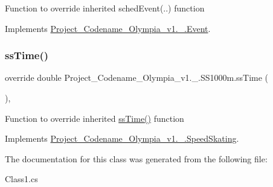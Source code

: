 Function to override inherited sched\+Event(..) function 

Implements \hyperlink{classProject__Codename__Olympia__v1_1_1__0_1_1Event_abb4e2b9c28527b9a28395f2fe9192196}{Project\+\_\+\+Codename\+\_\+\+Olympia\+\_\+v1.\+\_.\+Event}.

\mbox{\label{classProject__Codename__Olympia__v1_1_1__0_1_1SS1000m_a4bfd83bce70e047370288c0b651e3e1c}} 
\subsubsection{\texorpdfstring{ss\+Time()}{ssTime()}}
{\footnotesize\ttfamily override double Project\+\_\+\+Codename\+\_\+\+Olympia\+\_\+v1.\+\_.\+S\+S1000m.\+ss\+Time (\begin{DoxyParamCaption}{ }\end{DoxyParamCaption})\hspace{0.3cm}{\ttfamily [inline]}, {\ttfamily [virtual]}}

Function to override inherited \hyperlink{classProject__Codename__Olympia__v1_1_1__0_1_1SS1000m_a4bfd83bce70e047370288c0b651e3e1c}{ss\+Time()} function 

Implements \hyperlink{classProject__Codename__Olympia__v1_1_1__0_1_1SpeedSkating_acedc7b2f1bfab95ee054531364ea50fb}{Project\+\_\+\+Codename\+\_\+\+Olympia\+\_\+v1.\+\_.\+Speed\+Skating}.



The documentation for this class was generated from the following file\+:\begin{DoxyCompactItemize}
\item 
Class1.\+cs\end{DoxyCompactItemize}
